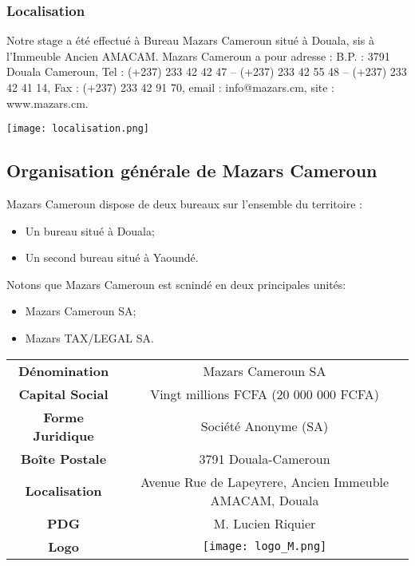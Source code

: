 \subsubsection{Localisation}
Notre stage a été effectué à Bureau Mazars Cameroun situé à Douala, sis à l’Immeuble Ancien AMACAM. Mazars Cameroun a pour adresse : B.P. : 3791 Douala Cameroun, Tel : (+237) 233 42 42 47 – (+237) 233 42 55 48 – (+237) 233 42 41 14, Fax : (+237) 233 42 91 70, email : info@mazars.cm, site : www.mazars.cm.

\texttt{[image: localisation.png]}

\subsection{Organisation générale de Mazars Cameroun}
Mazars Cameroun dispose de deux bureaux sur l’ensemble du territoire : 
\begin{itemize}
    \item Un bureau situé à Douala;
    \item Un second bureau situé à Yaoundé.
\end{itemize}
Notons que Mazars Cameroun est scnindé en deux principales unités:
\begin{itemize}
    \item Mazars Cameroun SA;
    \item Mazars TAX/LEGAL SA.
\end{itemize}
\begin{center}
    \begin{tabular}{c|c}
        \hline
         \textbf{Dénomination} & Mazars Cameroun SA  \\
         \textbf{Capital Social} & Vingt millions FCFA (20 000 000 FCFA) \\
         \textbf{Forme Juridique} & Société Anonyme (SA) \\
         \textbf{Boîte Postale} & 3791 Douala-Cameroun \\
         \textbf{Localisation} & Avenue Rue de Lapeyrere, Ancien Immeuble AMACAM, Douala \\
         \textbf{PDG} & M. Lucien Riquier \\
         \textbf{Logo} & \texttt{[image: logo\_M.png]}
    \end{tabular}
\end{center}

